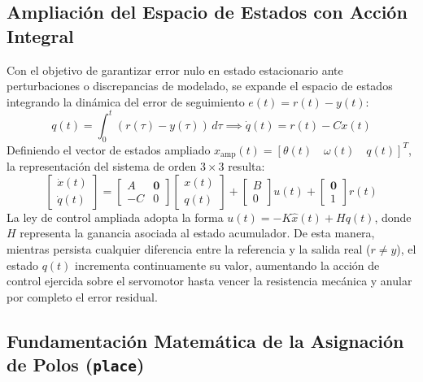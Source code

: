 \documentclass[a4paper, twoside, 10pt, spanish]{article}
\numberwithin{table}{section}
\begin{document}
\subsection{Ampliación del Espacio de Estados con Acción Integral}
Con el objetivo de garantizar error nulo en estado estacionario ante perturbaciones o discrepancias de modelado, se expande el espacio de estados integrando la dinámica del error de seguimiento $e(t) = r(t) - y(t)$:
\begin{equation}
q(t) = \int_{0}^{t} (r(\tau) - y(\tau)) \, d\tau \implies \dot{q}(t) = r(t) - C x(t)
\end{equation}
Definiendo el vector de estados ampliado $x_{\text{amp}}(t) = [\theta(t) \quad \omega(t) \quad q(t)]^T$, la representación del sistema de orden $3 \times 3$ resulta:
\begin{equation}
\begin{bmatrix} \dot{x}(t) \\ \dot{q}(t) \end{bmatrix} = \begin{bmatrix} A & \mathbf{0} \\ -C & 0 \end{bmatrix} \begin{bmatrix} x(t) \\ q(t) \end{bmatrix} + \begin{bmatrix} B \\ 0 \end{bmatrix} u(t) + \begin{bmatrix} \mathbf{0} \\ 1 \end{bmatrix} r(t)
\end{equation}
La ley de control ampliada adopta la forma $u(t) = -K \hat{x}(t) + H q(t)$, donde $H$ representa la ganancia asociada al estado acumulador. De esta manera, mientras persista cualquier diferencia entre la referencia y la salida real ($r \neq y$), el estado $q(t)$ incrementa continuamente su valor, aumentando la acción de control ejercida sobre el servomotor hasta vencer la resistencia mecánica y anular por completo el error residual.

\subsection{Fundamentación Matemática de la Asignación de Polos (\texttt{place})}
\end{document}
